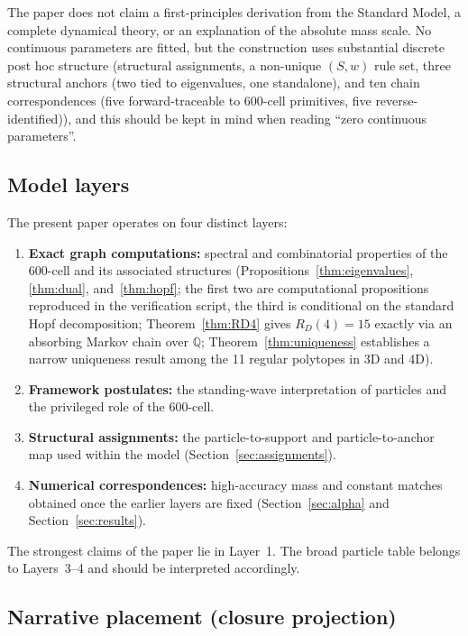 \documentclass[12pt]{article}
\begin{document}
The paper does not claim a first-principles derivation from the Standard Model, a complete dynamical theory, or an explanation of the absolute mass scale. No continuous parameters are fitted, but the construction uses substantial discrete post hoc structure (structural assignments, a non-unique $(S,w)$ rule set, three structural anchors (two tied to eigenvalues, one standalone), and ten chain correspondences (five forward-traceable to 600-cell primitives, five reverse-identified)), and this should be kept in mind when reading ``zero continuous parameters''.

\subsection*{Model layers}

The present paper operates on four distinct layers:

\begin{enumerate}
    \item \textbf{Exact graph computations:} spectral and combinatorial properties of the 600-cell and its associated structures (Propositions~\ref{thm:eigenvalues}, \ref{thm:dual}, and~\ref{thm:hopf}; the first two are computational propositions reproduced in the verification script, the third is conditional on the standard Hopf decomposition; Theorem~\ref{thm:RD4} gives $R_D(4) = 15$ exactly via an absorbing Markov chain over $\mathbb{Q}$; Theorem~\ref{thm:uniqueness} establishes a narrow uniqueness result among the 11 regular polytopes in 3D and 4D).
    \item \textbf{Framework postulates:} the standing-wave interpretation of particles and the privileged role of the 600-cell.
    \item \textbf{Structural assignments:} the particle-to-support and particle-to-anchor map used within the model (Section~\ref{sec:assignments}).
    \item \textbf{Numerical correspondences:} high-accuracy mass and constant matches obtained once the earlier layers are fixed (Section~\ref{sec:alpha} and Section~\ref{sec:results}).
\end{enumerate}

The strongest claims of the paper lie in Layer~1. The broad particle table belongs to Layers~3--4 and should be interpreted accordingly.

\subsection*{Narrative placement (closure projection)}
\end{document}
